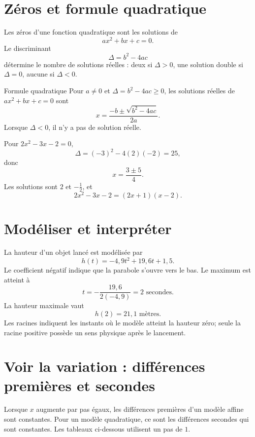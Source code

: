 \section{Zéros et formule quadratique}
\label{manual:section:04.03}

Les zéros d'une fonction quadratique sont les solutions de
\[
ax^2+bx+c=0.
\]
Le discriminant
\[
\Delta=b^2-4ac
\]
détermine le nombre de solutions réelles : deux si $\Delta>0$, une solution double si $\Delta=0$, aucune si $\Delta<0$.

\begin{theorem}{Formule quadratique}{}
Pour $a\neq0$ et $\Delta=b^2-4ac\geq0$, les solutions réelles de $ax^2+bx+c=0$ sont
\[
x=\frac{-b\pm\sqrt{b^2-4ac}}{2a}.
\]
Lorsque $\Delta<0$, il n'y a pas de solution réelle.
\end{theorem}

\begin{examplebox}
Pour $2x^2-3x-2=0$,
\[
\Delta=(-3)^2-4(2)(-2)=25,
\]
donc
\[
x=\frac{3\pm5}{4}.
\]
Les solutions sont $2$ et $-\frac12$, et
\[
2x^2-3x-2=(2x+1)(x-2).
\]
\end{examplebox}

\section{Modéliser et interpréter}
\label{manual:section:04.04}

\begin{examplebox}
La hauteur d'un objet lancé est modélisée par
\[
h(t)=-4{,}9t^2+19{,}6t+1{,}5.
\]
Le coefficient négatif indique que la parabole s'ouvre vers le bas. Le maximum est atteint à
\[
t=-\frac{19{,}6}{2(-4{,}9)}=2\text{ secondes}.
\]
La hauteur maximale vaut
\[
h(2)=21{,}1\text{ mètres}.
\]
Les racines indiquent les instants où le modèle atteint la hauteur zéro; seule la racine positive possède un sens physique après le lancement.
\end{examplebox}


\section{Voir la variation : différences premières et secondes}
\label{manual:section:04.05}

\begin{visualbox}
Lorsque $x$ augmente par pas égaux, les différences premières d'un modèle affine sont constantes. Pour un modèle quadratique, ce sont les différences secondes qui sont constantes. Les tableaux ci-dessous utilisent un pas de $1$.
\end{visualbox}

